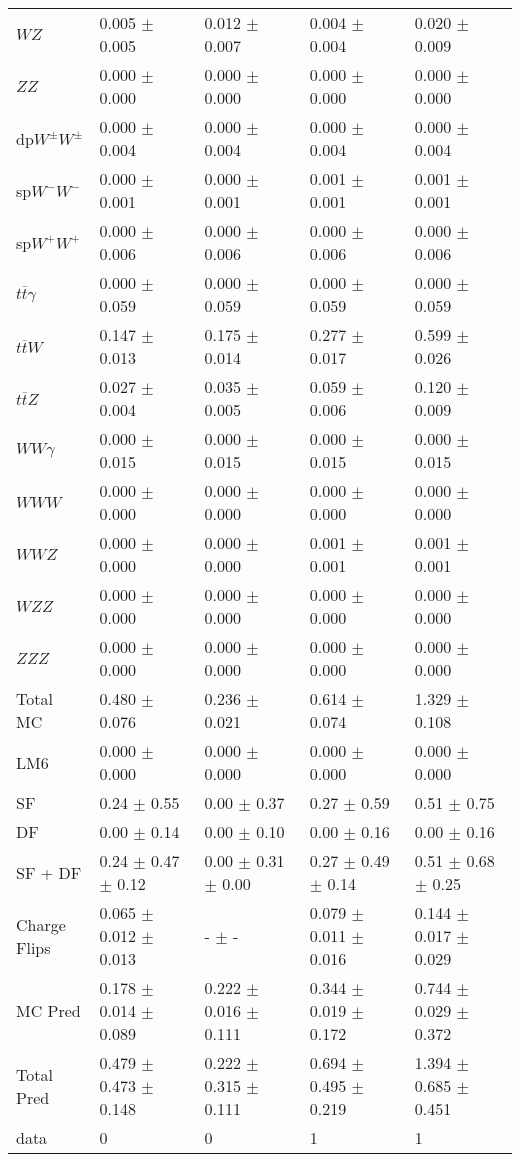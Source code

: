 \begin{tabular}{l | l l l l}
$WZ$ &  0.005 $\pm$  0.005 &  0.012 $\pm$  0.007 &  0.004 $\pm$  0.004 &  0.020 $\pm$  0.009\\
$ZZ$ &  0.000 $\pm$   0.000 &  0.000 $\pm$   0.000 &   0.000 $\pm$   0.000 &   0.000 $\pm$   0.000\\
\hline
dp$W^{\pm}W^{\pm}$ &  0.000 $\pm$  0.004 &  0.000 $\pm$  0.004 &  0.000 $\pm$  0.004 &  0.000 $\pm$  0.004\\
sp$W^{-}W^{-}$ &  0.000 $\pm$  0.001 &  0.000 $\pm$  0.001 &  0.001 $\pm$  0.001 &  0.001 $\pm$  0.001\\
sp$W^{+}W^{+}$ &  0.000 $\pm$  0.006 &  0.000 $\pm$  0.006 &  0.000 $\pm$  0.006 &  0.000 $\pm$  0.006\\
$t\overline{t}\gamma$ &  0.000 $\pm$  0.059 &  0.000 $\pm$  0.059 &  0.000 $\pm$  0.059 &  0.000 $\pm$  0.059\\
$t\overline{t}W$ &  0.147 $\pm$  0.013 &  0.175 $\pm$  0.014 &  0.277 $\pm$  0.017 &  0.599 $\pm$  0.026\\
$t\overline{t}Z$ &  0.027 $\pm$  0.004 &  0.035 $\pm$  0.005 &  0.059 $\pm$  0.006 &  0.120 $\pm$  0.009\\
$WW\gamma$ &  0.000 $\pm$  0.015 &  0.000 $\pm$  0.015 &  0.000 $\pm$  0.015 &  0.000 $\pm$  0.015\\
$WWW$ &  0.000 $\pm$   0.000 &   0.000 $\pm$   0.000 &   0.000 $\pm$   0.000 &   0.000 $\pm$   0.000\\
$WWZ$ &  0.000 $\pm$   0.000 &  0.000 $\pm$   0.000 &  0.001 $\pm$  0.001 &  0.001 $\pm$  0.001\\
$WZZ$ &   0.000 $\pm$   0.000 &   0.000 $\pm$   0.000 &  0.000 $\pm$   0.000 &   0.000 $\pm$   0.000\\
$ZZZ$ &   0.000 $\pm$   0.000 &  0.000 $\pm$   0.000 &   0.000 $\pm$   0.000 &   0.000 $\pm$   0.000\\
\hline
Total MC &  0.480 $\pm$  0.076 &  0.236 $\pm$  0.021 &  0.614 $\pm$  0.074 &  1.329 $\pm$  0.108\\
\hline\hline
\hline
LM6 &  0.000 $\pm$  0.000 &  0.000 $\pm$  0.000 &  0.000 $\pm$  0.000 &  0.000 $\pm$  0.000\\
\hline\hline
\hline\hline
 SF  & 0.24 $\pm$ 0.55 & 0.00 $\pm$ 0.37 & 0.27 $\pm$ 0.59 & 0.51 $\pm$ 0.75\\
 DF  & 0.00 $\pm$ 0.14 & 0.00 $\pm$ 0.10 & 0.00 $\pm$ 0.16 & 0.00 $\pm$ 0.16\\
\hline
 SF + DF  & 0.24 $\pm$ 0.47 $\pm$ 0.12 & 0.00 $\pm$ 0.31 $\pm$ 0.00 & 0.27 $\pm$ 0.49 $\pm$ 0.14 & 0.51 $\pm$ 0.68 $\pm$ 0.25\\
\hline\hline
Charge Flips & 0.065 $\pm$ 0.012 $\pm$ 0.013 & - $\pm$ - & 0.079 $\pm$ 0.011 $\pm$ 0.016 & 0.144 $\pm$ 0.017 $\pm$ 0.029\\
\hline\hline
\hline
MC Pred &  0.178 $\pm$  0.014 $\pm$  0.089 &  0.222 $\pm$  0.016 $\pm$  0.111 &  0.344 $\pm$  0.019 $\pm$  0.172 &  0.744 $\pm$  0.029 $\pm$  0.372\\
\hline\hline
Total Pred &  0.479 $\pm$  0.473 $\pm$  0.148 &  0.222 $\pm$  0.315 $\pm$  0.111 &  0.694 $\pm$  0.495 $\pm$  0.219 &  1.394 $\pm$  0.685 $\pm$  0.451\\
\hline\hline
data & 0 & 0 & 1 & 1\\
\hline\hline
\end{tabular}
